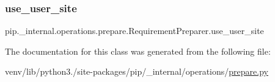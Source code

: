\subsubsection{\texorpdfstring{use\+\_\+user\+\_\+site}{use\_user\_site}}
{\footnotesize\ttfamily pip.\+\_\+internal.\+operations.\+prepare.\+Requirement\+Preparer.\+use\+\_\+user\+\_\+site}



The documentation for this class was generated from the following file\+:\begin{DoxyCompactItemize}
\item 
venv/lib/python3./site-\/packages/pip/\+\_\+internal/operations/\hyperlink{prepare_8py}{prepare.\+py}\end{DoxyCompactItemize}
